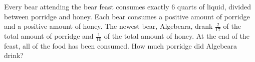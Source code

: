 Every bear attending the bear feast consumes exactly $6$ quarts of liquid, divided between porridge and honey. Each bear consumes a positive amount of porridge and a positive amount of honey. The newest bear, Algebeara, drank $\frac{2}{17}$ of the total amount of porridge and $\frac{1}{10}$ of the total amount of honey. At the end of the feast, all of the food has been consumed. How much porridge did Algebeara drink?
